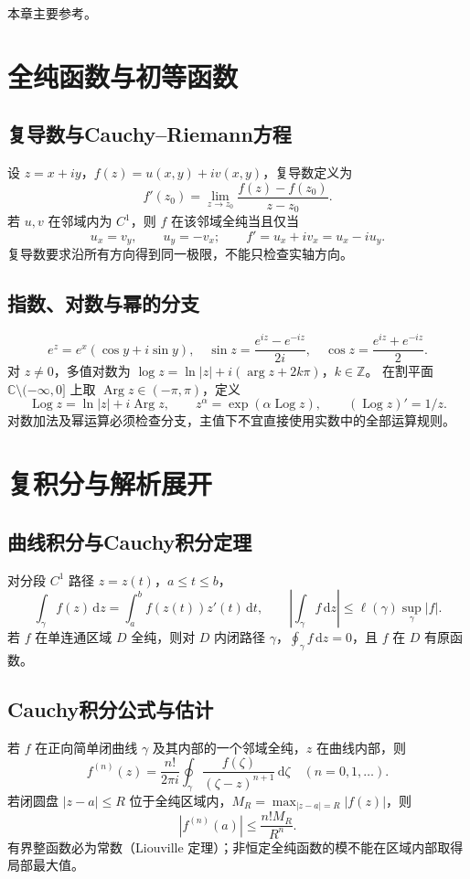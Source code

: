 \documentclass[../main.tex]{subfiles}
\begin{document}
本章主要参考\cite{complex,dlmf}。

\section{全纯函数与初等函数}
\subsection{复导数与Cauchy--Riemann方程}
设 $z=x+iy$，$f(z)=u(x,y)+iv(x,y)$，复导数定义为
\[
f'(z_0)=\lim_{z\to z_0}\frac{f(z)-f(z_0)}{z-z_0}.
\]
若 $u,v$ 在邻域内为 $C^1$，则 $f$ 在该邻域全纯当且仅当
\[
u_x=v_y,\qquad u_y=-v_x;\qquad f'=u_x+iv_x=u_x-iu_y.
\]
复导数要求沿所有方向得到同一极限，不能只检查实轴方向。
\subsection{指数、对数与幂的分支}
\[
e^z=e^x(\cos y+i\sin y),\quad
\sin z=\frac{e^{iz}-e^{-iz}}{2i},\quad\cos z=\frac{e^{iz}+e^{-iz}}2.
\]
对 $z\ne0$，多值对数为 $\log z=\ln|z|+i(\arg z+2k\pi)$，$k\in\mathbb Z$。
在割平面 $\mathbb C\setminus(-\infty,0]$ 上取 $\operatorname{Arg}z\in(-\pi,\pi)$，定义
\[
\operatorname{Log}z=\ln|z|+i\operatorname{Arg}z,\qquad
z^\alpha=\exp(\alpha\operatorname{Log}z),\qquad (\operatorname{Log}z)'=1/z.
\]
对数加法及幂运算必须检查分支，主值下不宜直接使用实数中的全部运算规则。
\section{复积分与解析展开}
\subsection{曲线积分与Cauchy积分定理}
对分段 $C^1$ 路径 $z=z(t)$，$a\le t\le b$，
\[
\int_\gamma f(z)\,\mathrm dz=\int_a^bf(z(t))z'(t)\,\mathrm dt,\qquad
\left|\int_\gamma f\,\mathrm dz\right|\le\ell(\gamma)\sup_\gamma|f|.
\]
若 $f$ 在单连通区域 $D$ 全纯，则对 $D$ 内闭路径 $\gamma$，$\oint_\gamma f\,\mathrm dz=0$，且 $f$ 在 $D$ 有原函数。
\subsection{Cauchy积分公式与估计}
若 $f$ 在正向简单闭曲线 $\gamma$ 及其内部的一个邻域全纯，$z$ 在曲线内部，则
\[
f^{(n)}(z)=\frac{n!}{2\pi i}\oint_\gamma\frac{f(\zeta)}{(\zeta-z)^{n+1}}\,\mathrm d\zeta
\quad(n=0,1,\ldots).
\]
若闭圆盘 $|z-a|\le R$ 位于全纯区域内，$M_R=\max_{|z-a|=R}|f(z)|$，则
\[
|f^{(n)}(a)|\le\frac{n!M_R}{R^n}.
\]
有界整函数必为常数（Liouville 定理）；非恒定全纯函数的模不能在区域内部取得局部最大值。
\end{document}
